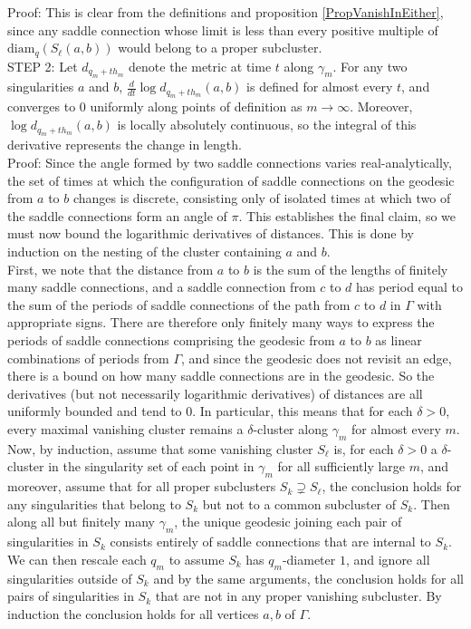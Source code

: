 \documentclass[12pt]{article}
\newcommand{\diam}{\mathrm{diam}}
\begin{document}
\noindent Proof: This is clear from the definitions and proposition \ref{PropVanishInEither}, since any saddle connection whose limit is less than every positive multiple of $\diam_q(S_\ell(a,b))$ would belong to a proper subcluster.\\

\noindent STEP 2: Let $d_{q_m + t h_m}$ denote the metric at time $t$ along $\gamma_m$. For any two singularities $a$ and $b$, $\frac{d}{dt}\log d_{q_m + t h_m}(a,b)$ is defined for almost every $t$, and converges to $0$ uniformly along points of definition as $m \to \infty$. Moreover, $\log d_{q_m + t h_m}(a,b)$ is locally absolutely continuous, so the integral of this derivative represents the change in length.\\

\noindent Proof: Since the angle formed by two saddle connections varies real-analytically, the set of times at which the configuration of saddle connections on the geodesic from $a$ to $b$ changes is discrete, consisting only of isolated times at which two of the saddle connections form an angle of $\pi$. This establishes the final claim, so we must now bound the logarithmic derivatives of distances. This is done by induction on the nesting of the cluster containing $a$ and $b$.\\

\noindent First, we note that the distance from $a$ to $b$ is the sum of the lengths of finitely many saddle connections, and a saddle connection from $c$ to $d$ has period equal to the sum of the periods of saddle connections of the path from $c$ to $d$ in $\Gamma$ with appropriate signs. There are therefore only finitely many ways to express the periods of saddle connections comprising the geodesic from $a$ to $b$ as linear combinations of periods from $\Gamma$, and since the geodesic does not revisit an edge, there is a bound on how many saddle connections are in the geodesic. So the derivatives (but not necessarily logarithmic derivatives) of distances are all uniformly bounded and tend to $0$. In particular, this means that for each $\delta > 0$, every maximal vanishing cluster remains a $\delta$-cluster along $\gamma_m$ for almost every $m$.\\

\noindent Now, by induction, assume that some vanishing cluster $S_\ell$ is, for each $\delta > 0$ a $\delta$-cluster in the singularity set of each point in $\gamma_m$ for all sufficiently large $m$, and moreover, assume that for all proper subclusters $S_k \supsetneq S_\ell$, the conclusion holds for any singularities that belong to $S_k$ but not to a common subcluster of $S_k$. Then along all but finitely many $\gamma_m$, the unique geodesic joining each pair of singularities in $S_k$ consists entirely of saddle connections that are internal to $S_k$. We can then rescale each $q_m$ to assume $S_k$ has $q_m$-diameter $1$, and ignore all singularities outside of $S_k$ and by the same arguments, the conclusion holds for all pairs of singularities in $S_k$ that are not in any proper vanishing subcluster. By induction the conclusion holds for all vertices $a,b$ of $\Gamma$.\\
\end{document}
